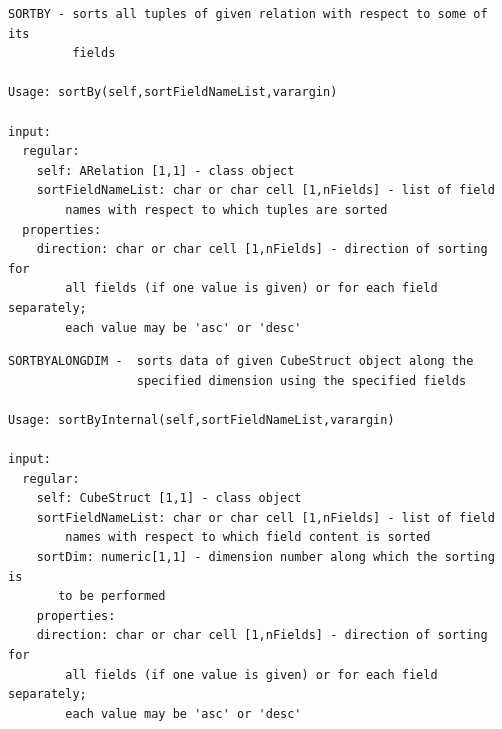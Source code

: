 \documentclass[letterpaper,10pt,english]{sphinxmanual}
\begin{document}
\label{chap_func:smartdb-relations-atypifiedstaticrelation-sortby}
\begin{Verbatim}[commandchars=\\\{\}]
SORTBY - sorts all tuples of given relation with respect to some of its
         fields

Usage: sortBy(self,sortFieldNameList,varargin)

input:
  regular:
    self: ARelation [1,1] - class object
    sortFieldNameList: char or char cell [1,nFields] - list of field
        names with respect to which tuples are sorted
  properties:
    direction: char or char cell [1,nFields] - direction of sorting for
        all fields (if one value is given) or for each field separately;
        each value may be 'asc' or 'desc'
\end{Verbatim}
\label{chap_func:smartdb-relations-atypifiedstaticrelation-sortbyalongdim}
\begin{Verbatim}[commandchars=\\\{\}]
SORTBYALONGDIM -  sorts data of given CubeStruct object along the
                  specified dimension using the specified fields

Usage: sortByInternal(self,sortFieldNameList,varargin)

input:
  regular:
    self: CubeStruct [1,1] - class object
    sortFieldNameList: char or char cell [1,nFields] - list of field
        names with respect to which field content is sorted
    sortDim: numeric[1,1] - dimension number along which the sorting is
       to be performed
    properties:
    direction: char or char cell [1,nFields] - direction of sorting for
        all fields (if one value is given) or for each field separately;
        each value may be 'asc' or 'desc'
\end{Verbatim}
\label{chap_func:smartdb-relations-atypifiedstaticrelation-toarray}
\end{document}
